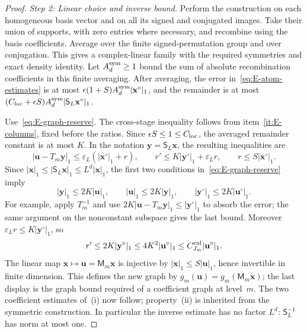 \begin{proof}
\emph{Step 2: Linear choice and inverse bound.}
Perform the construction on each homogeneous basis vector and on all its signed and conjugated images. Take their union of supports, with zero entries where necessary, and recombine using the basis coefficients. Average over the finite signed-permutation group and over conjugation. This gives a complex-linear family with the required symmetries and exact density identity. Let $A_d^{\rm sym}\ge1$ bound the sum of absolute recombination coefficients in this finite averaging. After averaging, the error in~\eqref{eq:E-atom-estimates} is at most $\epsilon(1+S)A_d^{\rm sym}|\mathbf x^\circ|_1$, and the remainder is at most $(C_{\rm loc}+\epsilon S)A_d^{\rm sym}|\mathsf S_L\mathbf x^\circ|_1$.

Use~\eqref{eq:E-graph-reserve}. The cross-stage inequality follows from item~\ref{it:E-columns}, fixed before the ratios. Since $\epsilon S\le1\le C_{\rm loc}$, the averaged remainder constant is at most $K$. In the notation $\mathbf y=\mathsf S_L\mathbf x$, the resulting inequalities are
\begin{equation*}
 |\mathbf u-T_m\mathbf y|_1\le \varepsilon_L(|\mathbf x^\circ|_1+r),\qquad
 r'\le K|\mathbf y^\circ|_1+\varepsilon_L r,\qquad r\le S|\mathbf x^\circ|_1.
\end{equation*}
Since $|\mathbf x|_1\le|\mathsf S_L\mathbf x|_1\le L^d|\mathbf x|_1$, the first two conditions in~\eqref{eq:E-graph-reserve} imply
\begin{equation*}
 |\mathbf y|_1\le2K|\mathbf u|_1,\qquad |\mathbf u|_1\le2K|\mathbf y|_1,
 \qquad |\mathbf y^\circ|_1\le2K|\mathbf u^\circ|_1.
\end{equation*}
For example, apply $T_m^{-1}$ and use
$2K|\mathbf u-T_m\mathbf y|_1\le|\mathbf y^\circ|_1$ to absorb the error; the same argument on the nonconstant subspace gives the last bound. Moreover $\varepsilon_L r\le K|\mathbf y^\circ|_1$, so
\begin{equation*}
 r'\le2K|\mathbf y^\circ|_1\le4K^2|\mathbf u^\circ|_1
 \le C^{\rm col}_{J_m}|\mathbf u^\circ|_1.
\end{equation*}
The linear map $\mathbf x\mapsto\mathbf u=\mathsf M_m\mathbf x$ is injective by $|\mathbf x|_1\le S|\mathbf u|_1$, hence invertible in finite dimension. This defines the new graph by $g_m(\mathbf u)=g_m(\mathsf M_m\mathbf x)$; the last display is the graph bound required of a coefficient graph at level~$m$. The two coefficient estimates of~(i) now follow; property~(ii) is inherited from the symmetric construction. In particular the inverse estimate has no factor $L^d$: $\mathsf S_L^{-1}$ has norm at most one.


\end{proof}
